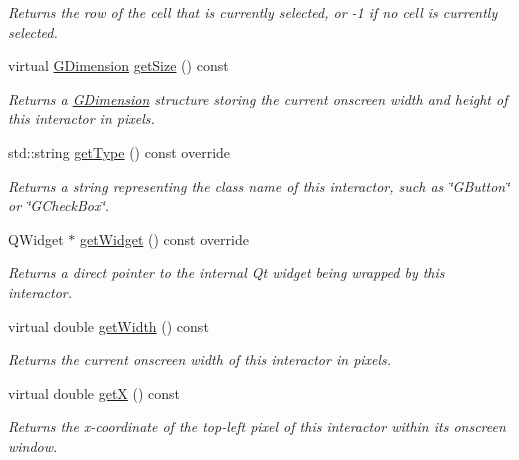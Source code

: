 \begin{DoxyCompactItemize}
\begin{DoxyCompactList}\small\item\em Returns the row of the cell that is currently selected, or -\/1 if no cell is currently selected. \end{DoxyCompactList}\item 
virtual \mbox{\hyperlink{structsgl_1_1GDimension}{G\+Dimension}} \mbox{\hyperlink{classsgl_1_1GInteractor_a7b4eec96a2bdc6420695d5796a78eea9}{get\+Size}} () const
\begin{DoxyCompactList}\small\item\em Returns a \mbox{\hyperlink{structsgl_1_1GDimension}{G\+Dimension}} structure storing the current onscreen width and height of this interactor in pixels. \end{DoxyCompactList}\item 
std\+::string \mbox{\hyperlink{classsgl_1_1GTable_a9b72ede4ee8520f987a0c01e30654814}{get\+Type}} () const override
\begin{DoxyCompactList}\small\item\em Returns a string representing the class name of this interactor, such as \char`\"{}\+G\+Button\char`\"{} or \char`\"{}\+G\+Check\+Box\char`\"{}. \end{DoxyCompactList}\item 
Q\+Widget $\ast$ \mbox{\hyperlink{classsgl_1_1GTable_a3b33a602b31a6b809d020535a59db3b4}{get\+Widget}} () const override
\begin{DoxyCompactList}\small\item\em Returns a direct pointer to the internal Qt widget being wrapped by this interactor. \end{DoxyCompactList}\item 
virtual double \mbox{\hyperlink{classsgl_1_1GInteractor_a0ed2965abd4f5701d2cadf71239faf19}{get\+Width}} () const
\begin{DoxyCompactList}\small\item\em Returns the current onscreen width of this interactor in pixels. \end{DoxyCompactList}\item 
virtual double \mbox{\hyperlink{classsgl_1_1GInteractor_a344385751bee0720059403940d57a13e}{getX}} () const
\begin{DoxyCompactList}\small\item\em Returns the x-\/coordinate of the top-\/left pixel of this interactor within its onscreen window. \end{DoxyCompactList}\item 

\end{DoxyCompactItemize}
